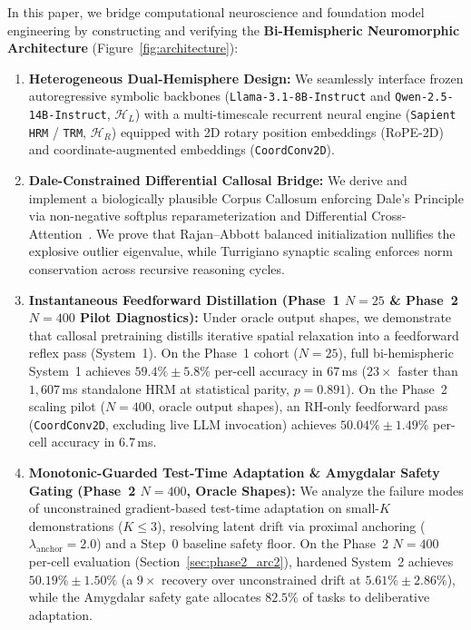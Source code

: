 \documentclass[11pt,a4paper]{article}
\theoremstyle{plain}
\theoremstyle{definition}
\theoremstyle{remark}
\newcommand{\HL}{\mathcal{H}_L}
\newcommand{\HR}{\mathcal{H}_R}
\begin{document}
In this paper, we bridge computational neuroscience and foundation model engineering by constructing and verifying the \textbf{Bi-Hemispheric Neuromorphic Architecture} (Figure~\ref{fig:architecture}):
\begin{enumerate}
    \item \textbf{Heterogeneous Dual-Hemisphere Design:} We seamlessly interface frozen autoregressive symbolic backbones (\texttt{Llama-3.1-8B-Instruct} and \texttt{Qwen-2.5-14B-Instruct}, $\HL$) with a multi-timescale recurrent neural engine (\texttt{Sapient HRM} / \texttt{TRM}, $\HR$) equipped with 2D rotary position embeddings (RoPE-2D) and coordinate-augmented embeddings (\texttt{CoordConv2D}).
    \item \textbf{Dale-Constrained Differential Callosal Bridge:} We derive and implement a biologically plausible Corpus Callosum enforcing Dale's Principle via non-negative softplus reparameterization and Differential Cross-Attention~\cite{ye2025differential}. We prove that Rajan--Abbott balanced initialization nullifies the explosive outlier eigenvalue, while Turrigiano synaptic scaling enforces norm conservation across recursive reasoning cycles.
    \item \textbf{Instantaneous Feedforward Distillation (Phase~1 $N=25$ \& Phase~2 $N=400$ Pilot Diagnostics):} Under oracle output shapes, we demonstrate that callosal pretraining distills iterative spatial relaxation into a feedforward reflex pass (System~1). On the Phase~1 cohort ($N = 25$), full bi-hemispheric System~1 achieves $59.4\% \pm 5.8\%$ per-cell accuracy in $67$\,ms ($23\times$ faster than $1{,}607$\,ms standalone HRM at statistical parity, $p = 0.891$). On the Phase~2 scaling pilot ($N = 400$, oracle output shapes), an RH-only feedforward pass (\texttt{CoordConv2D}, excluding live LLM invocation) achieves $50.04\% \pm 1.49\%$ per-cell accuracy in $6.7$\,ms.
    \item \textbf{Monotonic-Guarded Test-Time Adaptation \& Amygdalar Safety Gating (Phase~2 $N=400$, Oracle Shapes):} We analyze the failure modes of unconstrained gradient-based test-time adaptation on small-$K$ demonstrations ($K \le 3$), resolving latent drift via proximal anchoring ($\lambda_{\mathrm{anchor}} = 2.0$) and a Step~0 baseline safety floor. On the Phase~2 $N = 400$ per-cell evaluation (Section~\ref{sec:phase2_arc2}), hardened System~2 achieves $50.19\% \pm 1.50\%$ (a $9\times$ recovery over unconstrained drift at $5.61\% \pm 2.86\%$), while the Amygdalar safety gate allocates $82.5\%$ of tasks to deliberative adaptation.

\end{enumerate}
\end{document}
